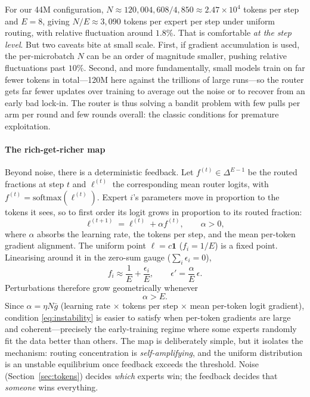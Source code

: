 For our 44M configuration, $N \approx 120{,}004{,}608 / 4{,}850
\approx 2.47 \times 10^4$ tokens per step and $E = 8$, giving
$N/E \approx 3{,}090$ tokens per expert per step under uniform
routing, with relative fluctuation around $1.8\%$. That is
comfortable \emph{at the step level}. But two caveats bite at small
scale. First, if gradient accumulation is used, the per-microbatch
$N$ can be an order of magnitude smaller, pushing relative
fluctuations past $10\%$. Second, and more fundamentally, small
models train on far fewer tokens in total---120M here against the
trillions of large runs---so the router gets far fewer updates over
training to average out the noise or to recover from an early
bad lock-in. The router is thus solving a bandit problem with few
pulls per arm per round and few rounds overall: the classic
conditions for premature exploitation.

\paragraph{The rich-get-richer map}
\label{sec:feedback}

Beyond noise, there is a deterministic feedback. Let
$f^{(t)} \in \Delta^{E-1}$ be the routed fractions at step $t$ and
$\ell^{(t)}$ the corresponding mean router logits, with
$f^{(t)} = \mathrm{softmax}(\ell^{(t)})$. Expert $i$'s parameters move
in proportion to the tokens it sees, so to first order its logit
grows in proportion to its routed fraction:
\begin{equation}
  \ell^{(t+1)} = \ell^{(t)} + \alpha f^{(t)}, \qquad \alpha > 0,
\end{equation}
where $\alpha$ absorbs the learning rate, the tokens per step, and
the mean per-token gradient alignment. The uniform point
$\ell = c\mathbf{1}$ ($f_i = 1/E$) is a fixed point. Linearising
around it in the zero-sum gauge ($\sum_i \epsilon_i = 0$),
\begin{equation}
  f_i \approx \frac{1}{E} + \frac{\epsilon_i}{E}, \qquad
  \epsilon' = \frac{\alpha}{E}\,\epsilon .
\end{equation}
Perturbations therefore grow geometrically whenever
\begin{equation}
  \alpha > E .
  \label{eq:instability}
\end{equation}
Since $\alpha = \eta N \bar{g}$ (learning rate $\times$ tokens per
step $\times$ mean per-token logit gradient), condition
\eqref{eq:instability} is easier to satisfy when per-token gradients
are large and coherent---precisely the early-training regime where
some experts randomly fit the data better than others. The map is
deliberately simple, but it isolates the mechanism: routing
concentration is \emph{self-amplifying}, and the uniform distribution
is an unstable equilibrium once feedback exceeds the threshold.
Noise (Section~\ref{sec:tokens}) decides \emph{which} experts win;
the feedback decides that \emph{someone} wins everything.


